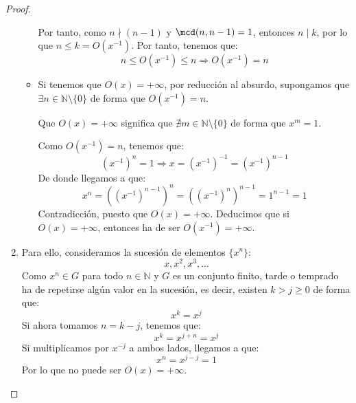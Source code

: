 \begin{prop}
\begin{proof}
\begin{enumerate}
\begin{itemize}
                    Por tanto, como $n \nmid (n-1)$ y $\mcd(n,n-1)=1$, entonces $n\mid k$, por lo que $n\leq k=O(x^{-1})$. Por tanto, tenemos que:
                    \begin{equation*}
                        n\leq O(x^{-1})\leq n \Longrightarrow O(x^{-1}) = n
                    \end{equation*}

                    \item Si tenemos que $O(x) = +\infty$, por reducción al absurdo, supongamos que $\exists n\in \mathbb{N}\setminus\{0\}$ de forma que $O(x^{-1}) = n$.

                        Que $O(x)=+\infty$ significa que $\nexists m\in \mathbb{N}\setminus\{0\}$ de forma que $x^m = 1$.

                        Como $O(x^{-1})=n$, tenemos que:
                        \begin{equation*}
                            {\left(x^{-1}\right)}^{n} = 1 \Longrightarrow x = {\left(x^{-1}\right)}^{-1} = {\left(x^{-1}\right)}^{n-1}
                        \end{equation*}
                        De donde llegamos a que:
                        \begin{equation*}
                            x^n = {\left({\left(x^{-1}\right)}^{n-1}\right)}^{n} = {\left({\left(x^{-1}\right)}^{n}\right)}^{n-1} = 1^{n-1} = 1
                        \end{equation*}
                        Contradicción, puesto que $O(x)=+\infty$. Deducimos que si $O(x)=+\infty$, entonces ha de ser $O(x^{-1})=+\infty$. 
                \end{itemize}
            \item Para ello, consideramos la sucesión de elementos $\{x^n\}$:
                \begin{equation*}
                    x, x^2, x^3, \ldots
                \end{equation*}
                Como $x^n\in G$ para todo $n\in \mathbb{N}$ y $G$ es un conjunto finito, tarde o temprado ha de repetirse algún valor en la sucesión, es decir, existen $k>j\geq 0$ de forma que:
                \begin{equation*}
                    x^k = x^j
                \end{equation*}
                Si ahora tomamos $n = k-j$, tenemos que:
                \begin{equation*}
                    x^k = x^{j+n} = x^j
                \end{equation*}
                Si multiplicamos por $x^{-j}$ a ambos lados, llegamos a que:
                \begin{equation*}
                    x^n = x^{j-j} = 1
                \end{equation*}
                Por lo que no puede ser $O(x)=+\infty$.
        \end{enumerate}
    \end{proof}
\end{prop}

